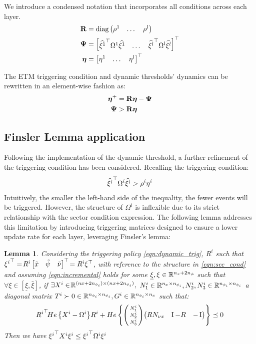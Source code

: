 \documentclass{ifacconf}
\theoremstyle{plain}
\newtheorem{lemma}{Lemma}
\begin{document}
We introduce a condensed notation that incorporates all conditions across each layer.
\begin{equation}
\begin{aligned}
   {\bf{R}} &= \text{diag} \left(\begin{matrix}\rho^1 & \dots & \rho^l \end{matrix}\right)\\
   \mathbf{\Psi} &= \left[\begin{matrix} {\widehat{\xi^1}}^\top \Omega^1 \widehat{\xi^1} & \dots & {\widehat{\xi^l}}^\top \Omega^l \widehat{\xi^l}\end{matrix}\right]^\top\\
   \boldsymbol{\eta} &= \left[\begin{matrix} \eta^1 & \dots & \eta^l\end{matrix}\right]^\top   
\end{aligned}
\end{equation}

The ETM triggering condition and dynamic thresholds' dynamics can be rewritten in an element-wise fashion as:
\begin{equation}
\begin{aligned}
    \boldsymbol{\eta}^+ &= {\bf{R}} \boldsymbol{\eta} - \mathbf{\Psi}\\
    \mathbf{\Psi} &> {\bf{R}} \boldsymbol{\eta}
\end{aligned}
\end{equation}

\subsection{Finsler Lemma application}
Following the implementation of the dynamic threshold, a further refinement of the triggering condition has been considered. Recalling the triggering condition:
$$
\widehat{{\xi^i}}^\top \Omega^i \widehat{\xi^i} > \rho^i \eta^i
$$
Intuitively, the smaller the left-hand side of the inequality, the fewer events will be triggered. However, the structure of $\Omega^i$ is inflexible due to its strict relationship with the sector condition expression. The following lemma addresses this limitation by introducing triggering matrices designed to ensure a lower update rate for each layer, leveraging Finsler's lemma:

\begin{lemma}\label{lem:finsler} \emph{Considering the triggering policy \eqref{eqn:dynamic_trig}, $R^i$ such that ${\xi^i}^\top = \!R^i \left[\begin{matrix}\tilde{x} & \tilde{\psi} & \tilde{\nu}\end{matrix}\right]^\top\! = R^i \xi^\top$, with reference to the structure in \eqref{eqn:sec_cond} and assuming \eqref{eqn:incremental} holds for some $\underline{\xi}, \relax{\xi} \in {\mathbb{R}}^{n_x + 2n_{\phi}}$ such that $\forall \xi \in \left[ \underline{\xi}, \bar{\xi}\right]$, if $\exists X^i \in\! {\mathbb{R}}^{(nx + 2n_{\phi_i}) \times (nx + 2n_{\phi_i})},$ $N^i_1 \in {\mathbb{R}}^{n_x \times n_{\phi_i}}, N^i_2, N^i_3 \in {\mathbb{R}}^{n_{\phi_i} \times n_{\phi_i}}$ a diagonal matrix $T^i \succ 0 \in {\mathbb{R}}^{n_{\phi_i} \times n_{\phi_i}}, G^i \in {\mathbb{R}}^{n_{\phi_i} \times n_x}$ such that:
\begin{equation}\label{eqn:finsler}
     {R^i}^\top\! He\left\{X^i - \Omega^i\right\}\! R^i + He\left\{ \left(\begin{smallmatrix} N^i_1\\ N^i_2\\ N^i_3 \end{smallmatrix} \right)\! \left(\begin{matrix}R N_{\nu x} & \operatorname{I} - R & -\operatorname{I}\end{matrix}\right)\right\} \preceq 0
\end{equation}
Then we have ${\xi^i}^\top X^i \xi^i \leq {\xi^i}^\top \Omega^i \xi^i$}
\end{lemma}
\end{document}
